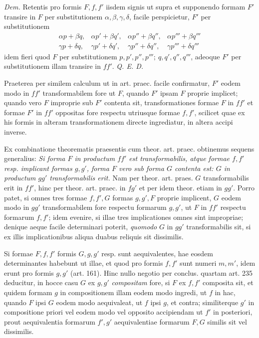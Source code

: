 \textit{Dem.} Retentis pro formis $F,f,f'$ iisdem signis ut supra et supponendo formam $F'$ transire in $F$ per substitutionem $\alpha,\beta,\gamma,\delta$, facile perspicietur, $F'$ per substitutionem
\[
\begin{array}{llll}
\alpha p+\beta q,&\alpha p'+\beta q',&\alpha p''+\beta q'',&\alpha p'''+\beta q'''\\
\gamma p+\delta q,&\gamma p'+\delta q',&\gamma p''+\delta q'',&\gamma p'''+\delta q'''
\end{array}
\]
idem fieri quod $F$ per substitutionem $p,p',p'',p''';\ q,q',q'',q'''$, adeoque $F'$ per substitutionem illam transire in $ff'$. \textit{Q. E. D.}

Praeterea per similem calculum ut in art. praec. facile confirmatur, $F'$ eodem modo in $ff'$ transformabilem fore ut $F$, quando $F'$ ipsam $F$ proprie implicet; quando vero $F$ improprie sub $F'$ contenta sit, transformationes formae $F$ in $ff'$ et formae $F'$ in $ff'$ oppositas fore respectu utriusque formae $f,f'$, scilicet
quae ex his formis in alteram transformationem directe ingrediatur, in altera accipi inverse.

Ex combinatione theorematis praesentis cum theor. art. praec. obtinemus sequens generalius: \textit{Si forma $F$ in productum $ff'$ est transformabilis, atque formae $f,f'$ resp. implicant formas $g,g'$, forma $F$ vero sub forma $G$ contenta est: $G$ in productum $gg'$ transformabilis erit.} Nam per theor. art. praes. $G$ transformabilis erit in $ff'$, hinc per theor. art. praec. in $fg'$ et per idem theor. etiam in $gg'$. Porro patet, si omnes tres formae $f,f',G$ formas $g,g',F$ proprie implicent, $G$ eodem modo in $gg'$ transformabilem fore respectu formarum $g,g'$, ut $F$ in $ff'$ respectu formarum $f,f'$; idem evenire, si illae tres implicationes omnes sint impropriae; denique aeque facile determinari poterit, \textit{quomodo} $G$ in $gg'$ transformabilis sit, si ex illis implicationibus aliqua duabus reliquis sit dissimilis.

Si formae $F,f,f'$ formis $G,g,g'$ resp. sunt aequivalentes, hae eosdem determinantes habebunt ut illae, et quod pro formis $f,f'$ sunt numeri $m,m'$, idem erunt pro formis $g,g'$ (art. 161). Hinc nullo negotio per conclus. quartam art. 235 deducitur, in hocce casu $G$ ex $g,g'$ \textit{compositam} fore, si $F$ ex $f,f'$ composita sit, et quidem formam $g$ in compositionem illam eodem modo ingredi, ut $f$ in hac, quando $F$ ipsi $G$ eodem modo aequivaleat, ut $f$ ipsi $g$, et contra; similiterque $g'$ in compositione priori vel eodem modo vel opposito accipiendam ut $f'$ in posteriori, prout aequivalentia formarum $f',g'$ aequivalentiae formarum $F,G$ similis sit vel dissimilis.

